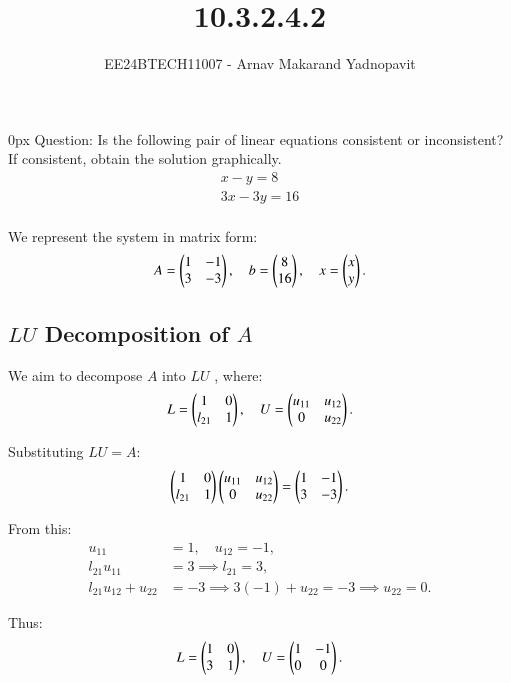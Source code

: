 \documentclass[journal,12pt,onecolumn]{IEEEtran}
\theoremstyle{remark}
\begin{document}
\title{10.3.2.4.2}
\author{EE24BTECH11007 - Arnav Makarand Yadnopavit}
\maketitle
\renewcommand{\thefigure}{\theenumi}
\renewcommand{\thetable}{\theenumi}
\parindent 0px Question: Is the following pair of linear equations consistent or inconsistent? If
consistent, obtain the solution graphically.
\begin{align*}
    x-y=8\\
    3x-3y=16
\end{align*}
\solution\\

We represent the system in matrix form:
\begin{align}
A = \begin{pmatrix}1 & -1 \\ 3 & -3\end{pmatrix}, \quad
b = \begin{pmatrix}8 \\ 16\end{pmatrix}, \quad
x = \begin{pmatrix}x \\ y\end{pmatrix}.
\end{align}

\subsection*{$LU$ Decomposition of $A$}
We aim to decompose $A$ into $LU$ , where:
\begin{align}
L = \begin{pmatrix}1 & 0 \\ l_{21} & 1\end{pmatrix}, \quad
U = \begin{pmatrix}u_{11} & u_{12} \\ 0 & u_{22}\end{pmatrix}.
\end{align}

Substituting  $LU = A$:
\begin{align}
\begin{pmatrix}1 & 0 \\ l_{21} & 1\end{pmatrix}
\begin{pmatrix}u_{11} & u_{12} \\ 0 & u_{22}\end{pmatrix}
=
\begin{pmatrix}1 & -1 \\ 3 & -3\end{pmatrix}.
\end{align}

From this:
\begin{align}
u_{11} &= 1, \quad u_{12} = -1, \\
l_{21}u_{11} &= 3 \implies l_{21} = 3, \\
l_{21}u_{12} + u_{22} &= -3 \implies 3(-1) + u_{22} = -3 \implies u_{22} = 0.
\end{align}

Thus:
\begin{align}
L = \begin{pmatrix}1 & 0 \\ 3 & 1\end{pmatrix}, \quad
U = \begin{pmatrix}1 & -1 \\ 0 & 0\end{pmatrix}.
\end{align}
\end{document}
